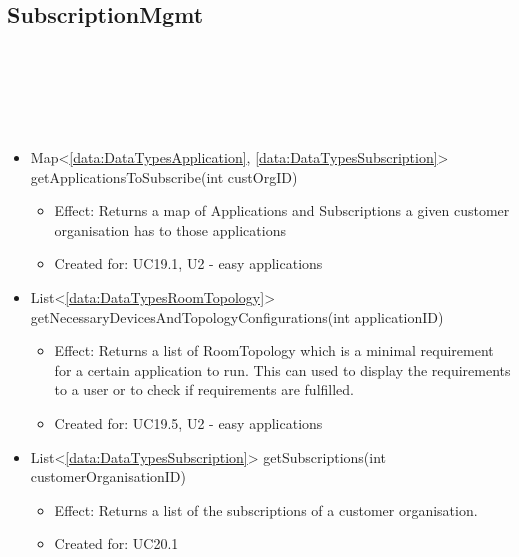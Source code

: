   \subsection{SubscriptionMgmt}\label{int:OnlineServiceOnlineServiceCustomerOrganisationFacadeSubscriptionMgmt}
    \begin{description}
      \item[Provided by:] \iconcomponent{}~
      \item[Required by:] \iconcomponent{}~
      \item[Operations:] ~
    \begin{itemize}[noitemsep,nolistsep,leftmargin=-.25cm]
      \item \textsf{Map\textless{}\ref{data:DataTypesApplication}, \ref{data:DataTypesSubscription}\textgreater{} getApplicationsToSubscribe(int custOrgID)}
        \begin{itemize}[noitemsep,nolistsep]
           \item Effect: Returns a map of Applications and Subscriptions a given customer organisation has to those applications
\item Created for: UC19.1, U2 - easy applications
        \end{itemize}
      \item \textsf{List\textless{}\ref{data:DataTypesRoomTopology}\textgreater{} getNecessaryDevicesAndTopologyConfigurations(int applicationID)}
        \begin{itemize}[noitemsep,nolistsep]
           \item Effect: Returns a list of RoomTopology which is a minimal requirement for a certain application to run. This can used to display the requirements to a user or to check if requirements are fulfilled.
\item Created for: UC19.5, U2 - easy applications
        \end{itemize}
      \item \textsf{List\textless{}\ref{data:DataTypesSubscription}\textgreater{} getSubscriptions(int customerOrganisationID)}
        \begin{itemize}[noitemsep,nolistsep]
           \item Effect: Returns a list of the subscriptions of a customer organisation.
\item Created for: UC20.1
        \end{itemize}

\end{itemize}
\end{description}
